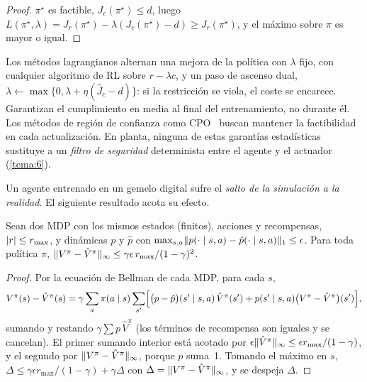 \begin{proof}
$\pi^{\star}$ es factible, $J_c(\pi^{\star})\le d$, luego $L(\pi^{\star},\lambda)=J_r(\pi^{\star})-\lambda(J_c(\pi^{\star})-d)\ge J_r(\pi^{\star})$, y el máximo sobre $\pi$ es mayor o igual.
\end{proof}

Los métodos lagrangianos alternan una mejora de la política con $\lambda$ fijo, con cualquier algoritmo de RL sobre $r-\lambda c$, y un paso de ascenso dual, $\lambda\leftarrow\max\{0,\lambda+\eta(\hat J_c-d)\}$: si la restricción se viola, el coste se encarece. Garantizan el cumplimiento en media al final del entrenamiento, no durante él. Los métodos de región de confianza como CPO~\cite{cpo} buscan mantener la factibilidad en cada actualización. En planta, ninguna de estas garantías estadísticas sustituye a un \emph{filtro de seguridad} determinista entre el agente y el actuador (\cref{tema:6}).

Un agente entrenado en un gemelo digital sufre el \emph{salto de la simulación a la realidad}. El siguiente resultado acota su efecto.

\begin{teorema}\label{teo:simlema}
Sean dos MDP con los mismos estados (finitos), acciones y recompensas, $\lvert r\rvert\le r_{\max}$, y dinámicas $p$ y $\hat p$ con $\max_{s,a}\lVert p(\cdot\mid s,a)-\hat p(\cdot\mid s,a)\rVert_1\le\epsilon$. Para toda política $\pi$, $\lVert V^{\pi}-\hat V^{\pi}\rVert_\infty\le\gamma\epsilon\,r_{\max}/(1-\gamma)^{2}$.
\end{teorema}

\begin{proof}
Por la ecuación de Bellman de cada MDP, para cada $s$,
\[
V^{\pi}(s)-\hat V^{\pi}(s)=\gamma\sum_a\pi(a\mid s)\sum_{s'}\Bigl[\bigl(p-\hat p\bigr)(s'\mid s,a)\,\hat V^{\pi}(s')+p(s'\mid s,a)\bigl(V^{\pi}-\hat V^{\pi}\bigr)(s')\Bigr],
\]
sumando y restando $\gamma\sum p\,\hat V^{\pi}$ (los términos de recompensa son iguales y se cancelan). El primer sumando interior está acotado por $\epsilon\lVert\hat V^{\pi}\rVert_\infty\le\epsilon r_{\max}/(1-\gamma)$, y el segundo por $\lVert V^{\pi}-\hat V^{\pi}\rVert_\infty$, porque $p$ suma~1. Tomando el máximo en $s$, $\Delta\le\gamma\epsilon r_{\max}/(1-\gamma)+\gamma\Delta$ con $\Delta=\lVert V^{\pi}-\hat V^{\pi}\rVert_\infty$, y se despeja $\Delta$.
\end{proof}

